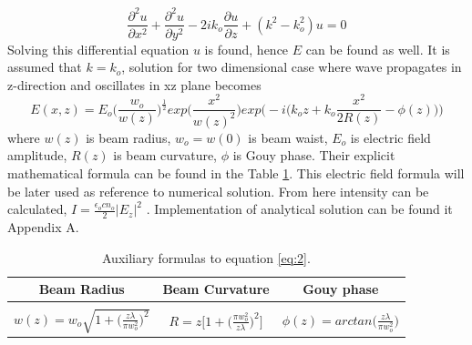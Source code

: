 \documentclass[a4paper]{article}
\begin{document}
	\begin{equation}\label{eq:1}
	\frac{\partial^2 u}{\partial x^2}+ \frac{\partial^2 u}{\partial y^2} - 2ik_o\frac{\partial u}{\partial z}+(k^2-k_o^2)u=0
	\end{equation}
	Solving this differential equation $u$ is found, hence $E$ can be found as well. It is assumed that $k = k_o$, solution for two dimensional case where wave propagates in z-direction and oscillates in xz plane becomes
	\begin{equation}\label{eq:2}
	E(x,z)=E_o\bigg(\frac{w_o}{w(z)}\bigg)^{\frac{1}{2}}exp\bigg(\frac{x^2}{w(z)^2}\bigg)exp\bigg(-i\Big(k_oz+k_o\frac{x^2}{2R(z)}-\phi(z)\Big)\bigg)
	\end{equation}
	where $w(z)$ is beam radius, $w_o = w(0)$ is beam waist, $E_o$ is electric field amplitude, $R(z)$ is beam curvature, $\phi$ is Gouy phase. Their explicit mathematical formula can be found in the Table \ref{tab:Table1}. This electric field formula will be later used as reference to numerical solution. From here intensity can be calculated, $I = \frac{\epsilon _o c n_o}{2}|E_z|^2$ \cite{link1}. Implementation of analytical solution can be found it Appendix A. 
	

	\begin{table}[h!]
		\begin{center}
			\begin{tabular}{c| c| c} %
				\textbf{Beam Radius} & \textbf{Beam Curvature} & \textbf{Gouy phase}\\
				\hline
				&&\\
				$w(z)= w_o\sqrt{1+\Big(\frac{z\lambda}{\pi w_o^2}\Big)^2}$ & $R=z\bigg[1+\Big(\frac{\pi w_o^2}{z\lambda}\Big)^2\bigg]$ & $\phi(z)=arctan\Big(\frac{z\lambda}{\pi w_o^2}\Big)$\\
			\end{tabular}
			\caption{\label{tab:Table1} Auxiliary formulas to equation \ref{eq:2}.}
		\end{center}
	\end{table}
	
\end{document}
